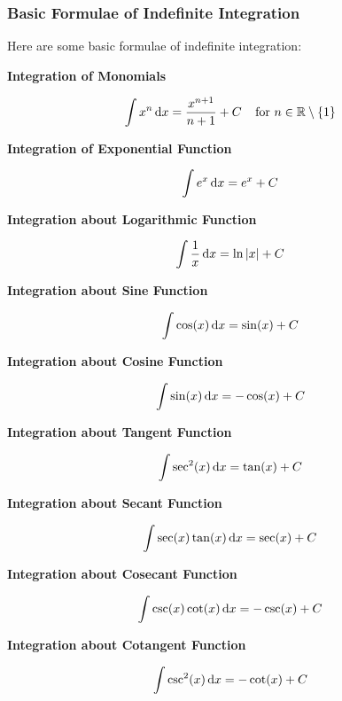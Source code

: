 \documentclass[a4paper,12pt]{article}
\begin{document}
\propdisp

\subsubsection{Basic Formulae of Indefinite Integration}
\begin{pst}
  Here are some basic formulae of indefinite integration:

  \begin{alist}
    \item \textbf{Integration of Monomials}

    $$\int x^{n}\,\mathrm{d} x=\frac{x^{n+1}}{n+1}+C\;\;\;\;\text{for }n\in\mathbb{R}\setminus\left\{ 1\right\}$$

    \item \textbf{Integration of Exponential Function}

    $$\int e^{x}\,\mathrm{d} x=e^{x}+C$$

    \item \textbf{Integration about Logarithmic Function}

    $$\int\frac{1}{x}\,\mathrm{d} x=\ln\left| x\right|+C$$

    \item \textbf{Integration about Sine Function}

    $$\int\cos(x)\,\mathrm{d} x=\sin(x)+C$$

    \item \textbf{Integration about Cosine Function}

    $$\int\sin(x)\,\mathrm{d} x=-\cos(x)+C$$

    \item \textbf{Integration about Tangent Function}

    $$\int\sec^{2}(x)\,\mathrm{d} x=\tan(x)+C$$

    \item \textbf{Integration about Secant Function}

    $$\int\sec(x)\tan(x)\,\mathrm{d} x=\sec(x)+C$$

    \item \textbf{Integration about Cosecant Function}

    $$\int\csc(x)\cot(x)\,\mathrm{d} x=-\csc(x)+C$$

    \item \textbf{Integration about Cotangent Function}

    $$\int\csc^{2}(x)\,\mathrm{d} x=-\cot(x)+C$$
  \end{alist}
\end{pst}

\propdisp
\end{document}

